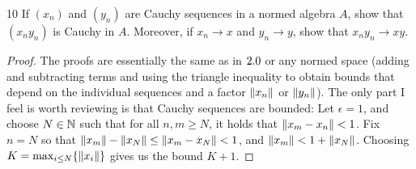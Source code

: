\begin{exercise}{10}
If $(x_n)$ and $(y_n)$ are Cauchy sequences in a normed algebra $A$, show that $(x_n y_n)$ is Cauchy in $A$.
Moreover, if $x_n \to x$ and $y_n \to y$, show that $x_n y_n \to xy$.
\end{exercise}
\begin{proof}
The proofs are essentially the same as in $2.0$ or any normed space (adding and subtracting terms and using the triangle inequality to obtain bounds that depend on the individual sequences and a factor $\left\lVert x_n\right\rVert$ or $\left\lVert y_n\right\rVert$).
The only part I feel is worth reviewing is that Cauchy sequences are bounded:
Let $\epsilon = 1$, and choose $N \in \mathbb{N}$ such that for all $n, m \geq N$, it holds that $\left\lVert x_m - x_n\right\rVert < 1$.
Fix $n = N$ so that $\left\lVert x_m\right\rVert - \left\lVert x_N\right\rVert \leq \left\lVert x_m - x_N\right\rVert < 1$, and $\left\lVert x_m\right\rVert < 1 + \left\lVert x_N\right\rVert$.
Choosing $K = \max_{i \leq N}\{\left\lVert x_i\right\rVert\}$ gives us the bound $K + 1$.
\end{proof} 
